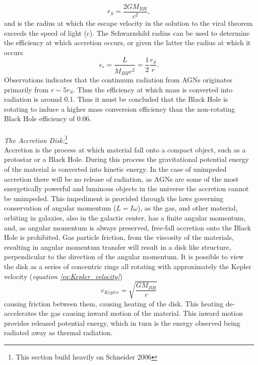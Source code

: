 \documentclass[a4paper, 12pt, twoside]{article}
\begin{document}
\begin{equation}
r_{S} = \frac{2GM_{BH}} {c^{2}},
\label{eq:r_S}
\end{equation}
and is the radius at which the escape velocity in the solution to the viral theorem exceeds the speed of light ($c$). The Schwarzshild radius can be used to determine the efficiency at which accretion occurs, or given the latter the radius at which it occurs
\begin{equation}
\epsilon_{r} = \frac{L} {\dot{M}_{BH}c^{2}} = \frac{1}{2}\frac{r_{S}}{r}.
\label{eq:epsilon_r}
\end{equation}
Observations indicates that the continuum radiation from AGNs originates primarily from $r\sim5r_{S}$. Thus the efficiency at which mass is converted into radiation is around 0.1. Thus it must be concluded that the Black Hole is rotating to induce a higher mass conversion efficiency than the non-rotating Black Hole efficiency of 0.06.  \\
\\
\emph{The Accretion Disk:}\footnote{This section build heavily on Schneider 2006} \\
Accretion is the process at which material fall onto a compact object, such as a protostar or a Black Hole. During this process the gravitational potential energy of the material is converted into kinetic energy. In the case of unimpeded accretion there will be no release of radiation, as AGNs are some of the most energetically powerful and luminous objects in the universe the accretion cannot be unimpeded. This impediment is provided through the laws governing conservation of angular momentum ($L=I\omega$), as the gas, and other material, orbiting in galaxies, also in the galactic center, has a finite angular momentum, and, as angular momentum is always preserved, free-fall accretion onto the Black Hole is prohibited. Gas particle friction, from the viscosity of the materials, resulting in angular momentum transfer will result in a disk like structure, perpendicular to the direction of the angular momentum. It is possible to view the disk as a series of concentric rings all rotating with approximately the Kepler velocity (\emph{equation \ref{eq:Kepler_velocity}})
\begin{equation}
v_{Kepler} = \sqrt{\frac{GM_{BH}}{r}}
\label{eq:Kepler_velocity}
\end{equation}
causing friction between them, causing heating of the disk. This heating de-accelerates the gas causing inward motion of the material. This inward motion provides released potential energy, which in turn is the energy observed being radiated away as thermal radiation. \\
\end{document}
